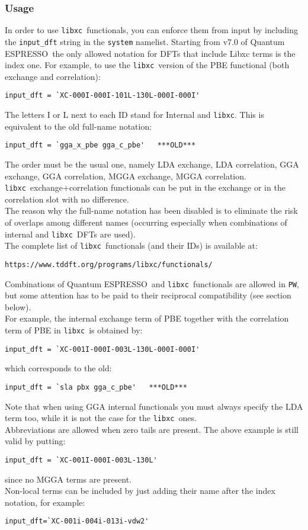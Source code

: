 \documentclass[12pt,a4paper]{article}
\def\qe{{\sc Quantum ESPRESSO}}
\def\libxc{\texttt{libxc}}
\begin{document}
\subsubsection{Usage}
In order to use \libxc\ functionals, you can enforce them from input by including the \texttt{input\_dft} string in the \texttt{system} namelist. Starting from v7.0 of \qe\ the only allowed notation for DFTs that include Libxc terms is the index one. For example, to use the \libxc\ version of the PBE functional (both exchange and correlation):
\begin{verbatim}
input_dft = `XC-000I-000I-101L-130L-000I-000I'
\end{verbatim}
The letters I or L next to each ID stand for Internal and \libxc. This is equivalent to the old full-name notation:
\begin{verbatim}
input_dft = `gga_x_pbe gga_c_pbe'   ***OLD***
\end{verbatim}
The order must be the usual one, namely LDA exchange, LDA correlation, GGA exchange, GGA correlation, MGGA exchange, MGGA correlation. \libxc\ exchange+correlation functionals can be put in the exchange or in the correlation slot with no difference.\\
The reason why the full-name notation has been disabled is to eliminate the risk of overlaps among different names (occurring especially when combinations of internal and \libxc\ DFTs are used).\\
%
The complete list of \libxc\ functionals (and their IDs) is available at:
\begin{verbatim}
https://www.tddft.org/programs/libxc/functionals/
\end{verbatim}
%
Combinations of \qe\ and \libxc\ functionals are allowed in \texttt{PW}, but some attention has to be paid to their reciprocal compatibility (see section below).\\
For example, the internal exchange term of PBE together with the correlation term of PBE in \libxc\ is obtained by:
\begin{verbatim}
input_dft = `XC-001I-000I-003L-130L-000I-000I'
\end{verbatim}
which corresponds to the old:
\begin{verbatim}
input_dft = `sla pbx gga_c_pbe'   ***OLD***
\end{verbatim}
Note that when using GGA internal functionals you must always specify the LDA term too, while it is not the case for the \libxc\ ones.\\
Abbreviations are allowed when zero tails are present. The above example is still valid by putting:
\begin{verbatim}
input_dft = `XC-001I-000I-003L-130L'
\end{verbatim}
since no MGGA terms are present.\\
Non-local terms can be included by just adding their name after the index notation, for example:
\begin{verbatim}
input_dft=`XC-001i-004i-013i-vdw2'
\end{verbatim}
%
\end{document}
